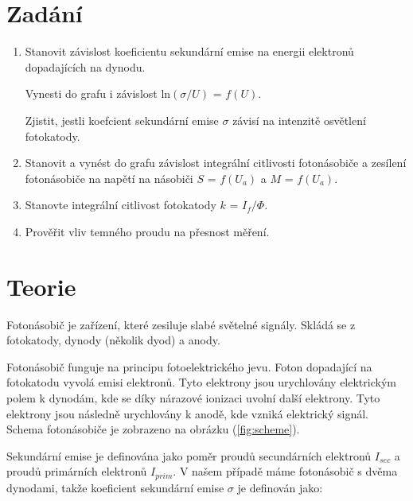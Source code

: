 \documentclass[a4paper,11pt]{article}
\begin{document}
\vskip10pt
    \begin{minipage}[t]{0.5\textwidth} 
        \section{Zadání}    
            \begin{enumerate}
                \item Stanovit závislost koeficientu sekundární emise na energii elektronů dopadajících na dynodu.
                \par Vynesti do grafu i závislost ln$(\sigma / U)$ = $f(U)$. 
                \par Zjistit, jestli koefcient sekundární emise $\sigma$
                závisí na intenzitě osvětlení fotokatody.

                \item Stanovit a vynést do grafu závislost integrální citlivosti fotonásobiče a zesílení fotonásobiče
                na napětí na násobiči $S$ = $f(U_a)$ a $M$ = $f(U_a)$.

                \item Stanovte integrální citlivost fotokatody $k$ = $I_f/\Phi$.
                
                \item Prověřit vliv temného proudu na přesnost měření.
            \end{enumerate}
        \section{Teorie}
                Fotonásobič je zařízení, které zesiluje slabé světelné signály. Skládá se z fotokatody, dynody (několik dyod) a anody. 
                \par Fotonásobič funguje na principu fotoelektrického jevu. Foton dopadající na fotokatodu vyvolá emisi elektronů. Tyto elektrony jsou urychlovány elektrickým polem k dynodám, kde se díky nárazové ionizaci uvolní další elektrony. Tyto elektrony jsou následně urychlovány k anodě, kde vzniká elektrický signál. Schema fotonásobiče je zobrazeno na obrázku (\ref{fig:scheme}).
                \par Sekundární emise je definována jako poměr proudů secundárních elektronů $I_{sec}$ a proudů primárních elektronů $I_{prim}$. V našem případě máme fotonásobič s dvěma dynodami, takže koeficient sekundární emise $\sigma$ je definován jako:
    \end{minipage}
    \hspace{10pt}
\end{document}
